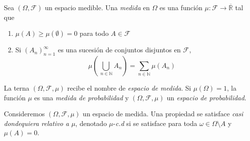 \documentclass[main.tex]{subfiles}
\begin{document}
\begin{definition}
Sea $(\Omega, \mathcal{F})$ un espacio medible. Una \textit{medida} en $\Omega$ es una función $\mu: \mathcal{F} \to \overline{\mathbb{R}}$ tal que
\begin{enumerate}[label=\roman*.]
	\item $\mu(A)\geq \mu(\emptyset)=0$ para todo $A\in\mathcal{F}$
	\item Si $(A_n)_{n=1}^\infty$ es una sucesión de conjuntos disjuntos en $\mathcal{F}$, 
	\begin{equation*}
	\mu\left(\bigcup_{\ n\in\mathbb{N}}A_n\right)=
	\sum_{n\in\mathbb{N}}\mu(A_n)	
	\end{equation*}
\end{enumerate}
La terna $(\Omega, \mathcal{F}, \mu)$ recibe el nombre de \textit{espacio de medida}. Si $\mu(\Omega)=1$, la función $\mu$ es una \textit{medida de probabilidad} y $(\Omega, \mathcal{F}, \mu)$ un \textit{espacio de probabilidad}.
\end{definition} 

\begin{definition}
Consideremos $(\Omega, \mathcal{F}, \mu)$ un espacio de medida. Una propiedad se satisface \textit{casi dondequiera relativo a} $\mu$, denotado $\mu$-\textit{c.d} si se satisface para toda $\omega\in \Omega\setminus A$ y $\mu(A)=0$.
\end{definition}
\end{document}
